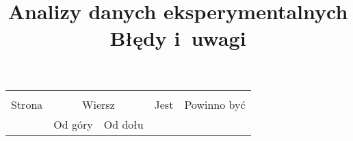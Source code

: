 \documentclass[a4paper,11pt]{article}
\title{Analizy danych eksperymentalnych \\
  Błędy i~uwagi}
\begin{document}





\maketitle %


















\begin{center}

  \begin{tabular}{|c|c|c|c|c|}
    \hline
    & \multicolumn{2}{c|}{} & & \\
    Strona & \multicolumn{2}{c|}{Wiersz} & Jest
                              & Powinno być \\ \cline{2-3}
    & Od góry & Od dołu & & \\
    \hline
    \hline
  \end{tabular}

\end{center}
\end{document}
